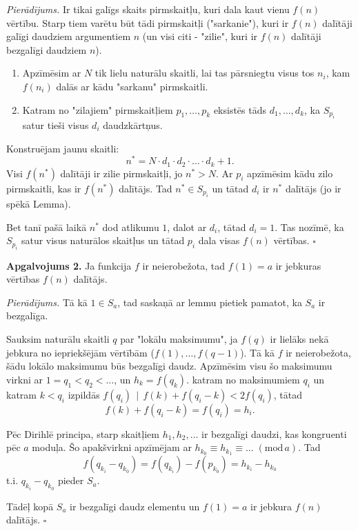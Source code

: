 \documentclass[11pt]{article}
\begin{document}
{\em Pierādījums.} Ir tikai galīgs skaits pirmskaitļu, kuri 
dala kaut vienu $f(n)$ vērtību. Starp tiem varētu 
būt tādi pirmskaitļi ("sarkanie"), kuri ir $f(n)$ dalītāji
galīgi daudziem argumentiem $n$ (un visi citi - "zilie", kuri ir $f(n)$
dalītāji bezgalīgi daudziem $n$). 

\begin{enumerate}
\item Apzīmēsim ar $N$ tik lielu naturālu skaitli, lai tas pārsniegtu visus
tos $n_i$, kam $f(n_i)$ dalās ar kādu "sarkanu" pirmskaitli. 
\item Katram no "zilajiem" pirmskaitļiem $p_1,\ldots,p_k$ eksistēs 
tāds $d_1,\ldots,d_k$, ka $S_{p_i}$ satur tieši visus $d_i$ daudzkārtņus. 
\end{enumerate}

Konstruējam jaunu skaitli:
$$n^{\ast} = N\cdot{}d_1\cdot{}d_2\cdot\ldots\cdot{}d_k + 1.$$
Visi $f(n^{\ast})$ dalītāji ir zilie pirmskaitļi, jo $n^{\ast}>N$. 
Ar $p_i$ apzīmēsim kādu zilo pirmskaitli, kas ir 
$f(n^{\ast})$ dalītājs. Tad $n^{\ast} \in S_{p_i}$ un tātad
$d_i$ ir $n^{\ast}$ dalītājs (jo ir spēkā Lemma). 

Bet tanī pašā laikā $n^{\ast}$ dod atlikumu $1$, dalot ar $d_i$, 
tātad $d_i = 1$. Tas nozīmē, ka $S_{p_i}$ satur visus naturālos skaitļus
un tātad $p_i$ dala visas $f(n)$ vērtības. $\square$



{\bf Apgalvojums 2.} Ja funkcija $f$ ir neierobežota, tad $f(1) = a$ 
ir jebkuras vērtības $f(n)$ dalītājs. 

{\em Pierādījums.} Tā kā $1 \in S_a$, tad saskaņā ar lemmu pietiek pamatot, 
ka $S_a$ ir bezgalīga. 

Sauksim naturālu skaitli $q$ par "lokālu maksimumu", ja 
$f(q)$ ir lielāks nekā jebkura no iepriekšējām vērtībām 
($f(1),\ldots,f(q-1)$). 
Tā kā $f$ ir neierobežota, šādu lokālo maksimumu būs bezgalīgi daudz. 
Apzīmēsim visu šo maksimumu virkni ar $1=q_1 < q_2<\ldots$, un 
$h_k = f(q_k)$. katram no maksimumiem $q_i$ un katram 
$k < q_i$ izpildās 
$f(q_i)\,\mid\,f(k)+f(q_i-k)<2f(q_i)$, tātad
$$f(k)+f(q_i-k) = f(q_i) = h_i.$$

Pēc Dirihlē principa, starp skaitļiem $h_1,h_2,\ldots$ ir bezgalīgi 
daudzi, kas kongruenti pēc $a$ moduļa. Šo apakšvirkni apzīmējam ar 
$h_{k_0}\equiv h_{k_1} \equiv \ldots\;(\mbox{mod}\,a)$. Tad
$$f(q_{k_i} - q_{k_0}) = f(q_{k_i}) - f(p_{k_0}) = h_{k_i} - h_{k_0}$$
t.i. $q_{k_i} - q_{k_0}$ pieder $S_a$.

Tādēļ kopā $S_a$ ir bezgalīgi daudz elementu un $f(1) = a$ ir jebkura $f(n)$ 
dalītājs. $\square$
\end{document}

